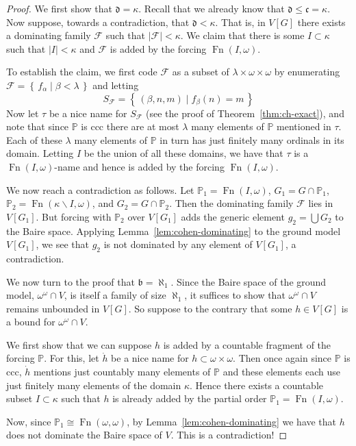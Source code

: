 \documentclass[11pt,oneside]{amsbook}
\newcommand{\set}[1]{\left\{\,#1\,\right\}}
\newcommand{\PP}{\mathbb P}
\DeclareMathOperator{\Fn}{Fn}
\theoremstyle{definition}
\theoremstyle{plain}
\theoremstyle{definition}
\theoremstyle{remark}
\numberwithin{equation}{section}
\numberwithin{figure}{section}
\begin{document}
\begin{proof}
  We first show that $\mathfrak d=\kappa$. Recall that we already know that $\mathfrak d\leq\mathfrak c=\kappa$. Now suppose, towards a contradiction, that $\mathfrak d<\kappa$. That is, in $V[G]$ there exists a dominating family $\mathcal F$ such that $|\mathcal F|<\kappa$. We claim that there is some $I\subset\kappa$ such that $|I|<\kappa$ and $\mathcal F$ is added by the forcing $\Fn(I,\omega)$.

  To establish the claim, we first code $\mathcal F$ as a subset of $\lambda\times\omega\times\omega$ by enumerating $\mathcal F=\set{f_\alpha\mid\beta<\lambda}$ and letting
  \[S_{\mathcal F}=\set{(\beta,n,m)\mid f_\beta(n)=m}
  \]
  Now let $\tau$ be a nice name for $S_{\mathcal F}$ (see the proof of Theorem~\ref{thm:ch-exact}), and note that since $\PP$ is ccc there are at most $\lambda$ many elements of $\PP$ mentioned in $\tau$. Each of these $\lambda$ many elements of $\PP$ in turn has just finitely many ordinals in its domain. Letting $I$ be the union of all these domains, we have that $\tau$ is a $\Fn(I,\omega)$-name and hence is added by the forcing $\Fn(I,\omega)$.

  We now reach a contradiction as follows. Let $\PP_1=\Fn(I,\omega)$, $G_1=G\cap\PP_1$, $\PP_2=\Fn(\kappa\smallsetminus I,\omega)$, and $G_2=G\cap\PP_2$. Then the dominating family $\mathcal F$ lies in $V[G_1]$. But forcing with $\PP_2$ over $V[G_1]$ adds the generic element $g_2=\bigcup G_2$ to the Baire space. Applying Lemma~\ref{lem:cohen-dominating} to the ground model $V[G_1]$, we see that $g_2$ is not dominated by any element of $V[G_1]$, a contradiction.

  We now turn to the proof that $\mathfrak b=\aleph_1$. Since the Baire space of the ground model, $\omega^\omega\cap V$, is itself a family of size $\aleph_1$, it suffices to show that $\omega^\omega\cap V$ remains unbounded in $V[G]$. So suppose to the contrary that some $h\in V[G]$ is a bound for $\omega^\omega\cap V$.

  We first show that we can suppose $h$ is added by a countable fragment of the forcing $\PP$. For this, let $\dot h$ be a nice name for $h\subset\omega\times\omega$. Then once again since $\PP$ is ccc, $\dot h$ mentions just countably many elements of $\PP$ and these elements each use just finitely many elements of the domain $\kappa$. Hence there exists a countable subset $I\subset\kappa$ such that $h$ is already added by the partial order $\PP_1=\Fn(I,\omega)$.

  Now, since $\PP_1\cong\Fn(\omega,\omega)$, by Lemma~\ref{lem:cohen-dominating} we have that $h$ does not dominate the Baire space of $V$. This is a contradiction!
\end{proof}
\end{document}
